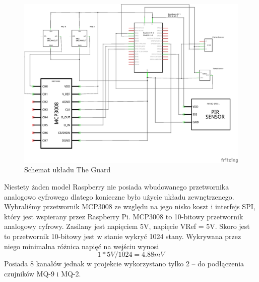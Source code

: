 \begin{figure}[h]
	\centering
	\includegraphics[width=15cm]{GuardSchem}
	\caption{Schemat układu The Guard}
\end{figure}

Niestety żaden model Raspberry nie posiada wbudowanego przetwornika analogowo cyfrowego dlatego konieczne było użycie układu zewnętrzenego. Wybraliśmy przetwornik MCP3008 ze względu na jego nisko koszt i interfejs SPI, który jest wspierany przez Raspberry Pi.
MCP3008 to 10-bitowy przetwornik analogowy cyfrowy. Zasilany jest napięciem 5V, napięcie VRef = 5V.  Skoro jest to przetwornik 10-bitowy jest w stanie wykryć 1024 stany. Wykrywana przez niego minimalna różnica napięć na wejściu wynosi 
\begin{equation}
1 * 5V / 1024 = 4.88mV
\end{equation}
Posiada 8 kanałów jednak w projekcie wykorzystano tylko 2 – do podłączenia czujników MQ-9 i MQ-2.

